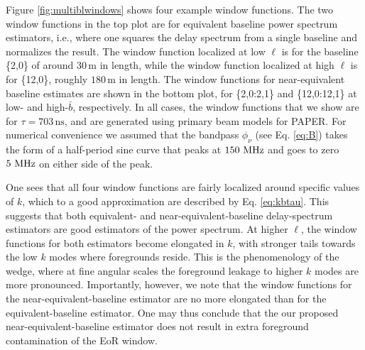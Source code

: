 \documentclass[twocolumn,apj,numberedappendix]{emulateapj}
\renewcommand\[{\begin{equation}}
\renewcommand\]{\end{equation}}
\begin{document}
Figure \ref{fig:multiblwindows} shows four example window functions. The two window functions in the top plot are for equivalent baseline power spectrum estimators, i.e., where one squares the delay spectrum from a single baseline and normalizes the result. The window function localized at low $\ell$ is for the baseline \{2,0\} of around $30\,\textrm{m}$ in length, while the window function localized at high $\ell$ is for \{12,0\}, roughly $180\,\textrm{m}$ in length. The window functions for near-equivalent baseline estimates are shown in the bottom plot, for \{2,0:2,1\} and \{12,0:12,1\} at low- and high-$\bar{b}$, respectively. In all cases, the window functions that we show are for $\tau = 703\,\textrm{ns}$, and are generated using primary beam models for PAPER. For numerical convenience we assumed that the bandpass $\phi_\nu$ (see Eq. \eqref{eq:B}) takes the form of a half-period sine curve that peaks at $150\,\textrm{\,MHz}$ and goes to zero $5\,\textrm{\,MHz}$ on either side of the peak.

One sees that all four window functions are fairly localized around specific values of $k$, which to a good approximation are described by Eq. \eqref{eq:kbtau}. This suggests that both equivalent- and near-equivalent-baseline delay-spectrum estimators are good estimators of the power spectrum. At higher $\ell$, the window functions for both estimators become elongated in $k$, with stronger tails towards the low $k$ modes where foregrounds reside. This is the phenomenology of the wedge, where at fine angular scales the foreground leakage to higher $k$ modes are more pronounced. Importantly, however, we note that the window functions for the near-equivalent-baseline estimator are no more elongated than for the equivalent-baseline estimator. One may thus conclude that the our proposed near-equivalent-baseline estimator does not result in extra foreground contamination of the EoR window.

\end{document}
